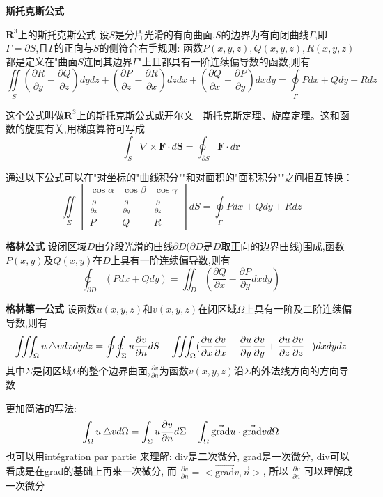 \bigskip
\textbf{斯托克斯公式}

$\mathbf{R}^3$上的斯托克斯公式
设$S$是分片光滑的有向曲面,$S$的边界为有向闭曲线$Γ$,即$\Gamma=\partial S$,且$Γ$的正向与$S$的侧符合右手规则: 函数$P(x,y,z),Q(x,y,z),R(x,y,z)$都是定义在"曲面$S$连同其边界$Γ$"上且都具有一阶连续偏导数的函数,则有
$$\iint\limits_{S}(\frac{\partial R}{\partial y}-\frac{\partial Q}{\partial z})dydz+(\frac{\partial P}{\partial z}-\frac{\partial R}{\partial x})dzdx+(\frac{\partial Q}{\partial x}-\frac{\partial P}{\partial y})dxdy
=\oint\limits_{\Gamma}Pdx+Qdy+Rdz$$

这个公式叫做$\mathbf{R}^3$上的斯托克斯公式或开尔文－斯托克斯定理、旋度定理。这和函数的旋度有关,用梯度算符可写成
$$
 \int_{S} \nabla \times \mathbf{F} \cdot d\mathbf{S} = \oint_{\partial S} \mathbf{F} \cdot d \mathbf{r}
$$

通过以下公式可以在"对坐标的"曲线积分""和对面积的"面积积分""之间相互转换：
$$
\iint\limits_{\Sigma}\begin{vmatrix} \cos \alpha & \cos \beta & \cos \gamma \\ \frac{\partial}{\partial x} & \frac{\partial}{\partial y} & \frac{\partial}{\partial z} \\ P & Q & R \end{vmatrix}dS=\oint\limits_{\Gamma}Pdx+Qdy+Rdz
$$

\bigskip
\textbf{格林公式}
设闭区域$D$由分段光滑的曲线$\partial D$($\partial D$是$D$取正向的边界曲线)围成,函数$P(x,y)$及$Q(x,y)$在$D$上具有一阶连续偏导数,则有
$$\oint_{\partial D} (Pdx+Qdy) = \iint_D (\frac{\partial Q}{\partial x} - \frac{\partial  P}{\partial y}dxdy)$$

\bigskip
\textbf{格林第一公式}
设函数$u(x,y,z)$和$v(x,y,z)$在闭区域$\Omega$上具有一阶及二阶连续偏导数,则有
$$\iiint_{\Omega} u\mathop{}\!\mathbin\bigtriangleup v dxdydz
=
\oint\!\oint_{\Sigma} u \frac{\partial v}{\partial n}dS -
\iiint_{\Omega}(
\frac{\partial  u}{\partial x}\frac{\partial v}{\partial x}+
\frac{\partial  u}{\partial y}\frac{\partial v}{\partial y}+
\frac{\partial  u}{\partial z}\frac{\partial v}{\partial z}+
)dxdydz$$
其中$\Sigma$是闭区域$\Omega$的整个边界曲面,$\frac{\partial v}{\partial n}$为函数$v(x,y,z)$沿$\Sigma$的外法线方向的方向导数

更加简洁的写法:
$$
\int_{\Omega}u \mathop{}\!\mathbin\bigtriangleup v d\Omega = \int_{\Sigma}u \frac{\partial v}{\partial n}d\Sigma - \int_{\Omega} \vec{\mbox{grad}}u \cdot \vec{\mbox{grad}} v d\Omega
$$
也可以用int\'egration par partie 来理解:
div是二次微分, grad是一次微分, div可以看成是在grad的基础上再来一次微分, 而
$ \frac{\partial  v}{\partial n} = <\vec{\mbox{grad}} v,\vec{n}>$, 所以
$\frac{\partial  v}{\partial n}$ 可以理解成一次微分

